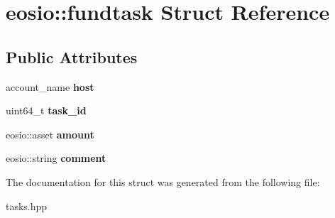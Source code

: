 \hypertarget{structeosio_1_1fundtask}{}\section{eosio\+:\+:fundtask Struct Reference}
\label{structeosio_1_1fundtask}
\subsection*{Public Attributes}
\begin{DoxyCompactItemize}
\item 
\mbox{\label{structeosio_1_1fundtask_a2f2f5eb5fe7194eee350c1543b6f6cf4}} 
account\+\_\+name {\bfseries host}
\item 
\mbox{\label{structeosio_1_1fundtask_ac39e5c821e28487a13ff10c2008b5360}} 
uint64\+\_\+t {\bfseries task\+\_\+id}
\item 
\mbox{\label{structeosio_1_1fundtask_a76153d01e08071cd8eb2de66757a7676}} 
eosio\+::asset {\bfseries amount}
\item 
\mbox{\label{structeosio_1_1fundtask_a1d5b21e0ba4b4be1fec8448c8ccc52eb}} 
eosio\+::string {\bfseries comment}
\end{DoxyCompactItemize}


The documentation for this struct was generated from the following file\+:\begin{DoxyCompactItemize}
\item 
tasks.\+hpp\end{DoxyCompactItemize}
